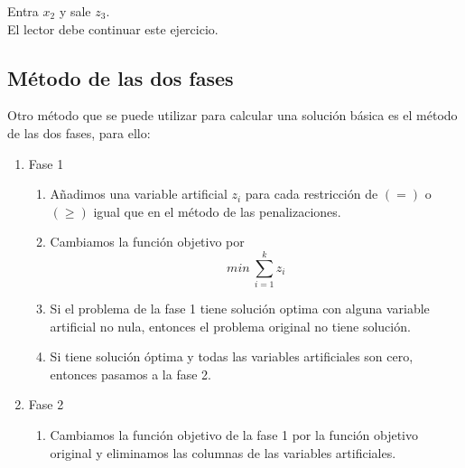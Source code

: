 Entra $x_2$ y sale $z_3$. \\
El lector debe continuar este ejercicio.


\subsection{Método de las dos fases}
Otro método que se puede utilizar para calcular una solución básica es
el método de las dos fases, para ello:
\begin{enumerate}
  \item Fase 1
  \begin{enumerate}
    \item Añadimos una variable artificial $z_i$ para cada restricción de $(=)$ o $(\geq)$ igual que en el método de las penalizaciones.
    \item Cambiamos la función objetivo por
    $$ min ~ \sum_{i=1}^{k}z_i $$
    \item Si el problema de la fase 1 tiene solución optima con alguna variable artificial no nula, entonces el problema original no tiene solución.
    \item Si tiene solución óptima y todas las variables artificiales son cero, entonces pasamos a la fase 2.
  \end{enumerate}
  \item Fase 2
  \begin{enumerate}
    \item Cambiamos la función objetivo de la fase 1 por la función objetivo original y eliminamos las columnas de las variables artificiales.
  \end{enumerate}
\end{enumerate}

